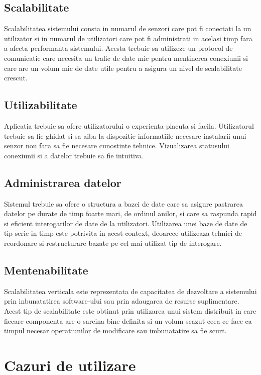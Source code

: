 \subsection{Scalabilitate}\label{subsec:cnf_scalabilitate}
Scalabilitatea sistemului consta in numarul de senzori care pot fi conectati la un utilizator si in numarul de utilizatori care pot fi administrati 
in acelasi timp fara a afecta performanta sistemului. Acesta trebuie sa utilizeze un protocol de comunicatie care necesita un trafic de date mic pentru 
mentinerea conexiunii si care are un volum mic de date utile pentru a asigura un nivel de scalabilitate crescut.

\subsection{Utilizabilitate}\label{subsec:cnf_utilizabilitate}
Aplicatia trebuie sa ofere utilizatorului o experienta placuta si facila. Utilizatorul trebuie sa fie ghidat si sa aiba la dispozitie informatiile necesare
instalarii unui senzor nou fara sa fie necesare cunostinte tehnice. Vizualizarea statusului conexiunii si a datelor trebuie sa fie intuitiva.

\subsection{Administrarea datelor}\label{subsec:cnf_administrare}
Sistemul trebuie sa ofere o structura a bazei de date care sa asigure pastrarea datelor pe durate de timp foarte mari, de ordinul anilor, si care sa 
raspunda rapid si eficient interogarilor de date de la utilizatori. Utilizarea unei baze de date de tip serie in timp este potrivita in acest context, 
deoarece utilizeaza tehnici de reordonare si restructurare bazate pe cel mai utilizat tip de interogare.

\subsection{Mentenabilitate}\label{subsec:cnf_mentenabilitate}
Scalabilitatea verticala este reprezentata de capacitatea de dezvoltare a sistemului prin inbunatatirea software-ului sau prin adaugarea de resurse 
suplimentare. Acest tip de scalabilitate este obtinut prin utilizarea unui sistem distribuit in care fiecare componenta are o sarcina bine definita 
si un volum scazut ceea ce face ca timpul necesar operatiunilor de modificare sau imbunatatire sa fie scurt.

\section{Cazuri de utilizare}\label{sec:cazuri_de_utilizare}
